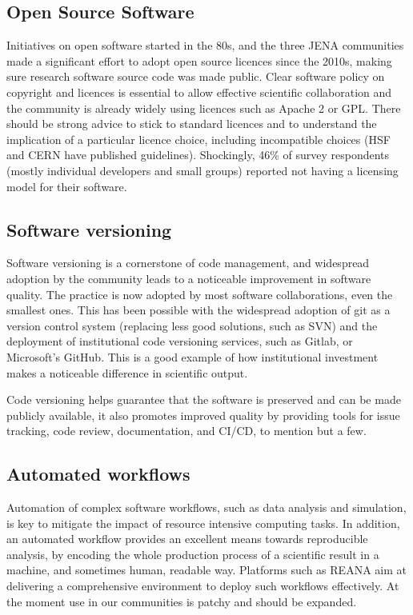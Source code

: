 \subsection{Open Source Software}

Initiatives on open software started in the 80s, and the three JENA communities made a significant effort to adopt open source licences since the 2010s, making sure research software source code was made public. Clear software policy on copyright and licences is essential to allow effective scientific collaboration and the community is already widely using licences such as Apache 2 or GPL. There should be strong advice to stick to standard licences and to understand the implication of a particular licence choice, including incompatible choices (HSF and CERN have published guidelines). Shockingly, 46\% of survey respondents (mostly individual developers and small groups) reported not having a licensing model for their software.

\subsection{Software versioning}

Software versioning is a cornerstone of code management, and widespread adoption by the community leads to a noticeable improvement in software quality. The practice is now adopted by most software collaborations, even the smallest ones. This has been possible with the widespread adoption of git as a version control system (replacing less good solutions, such as SVN) and the deployment of institutional code versioning services, such as Gitlab, or Microsoft’s GitHub. This is a good example of how institutional investment makes a noticeable difference in scientific output.

Code versioning helps guarantee that the software is preserved and can be made publicly available, it also promotes improved quality by providing tools for issue tracking, code review, documentation, and CI/CD, to mention but a few. 


\subsection{Automated workflows}

Automation of complex software workflows, such as data analysis and simulation, is key to mitigate the impact of resource intensive computing tasks. In addition, an automated workflow provides an excellent means towards reproducible analysis, by encoding the whole production process of a scientific result in a machine, and sometimes human, readable way. Platforms such as REANA aim at delivering a comprehensive environment to deploy such workflows effectively. At the moment use in our communities is patchy and should be expanded.

